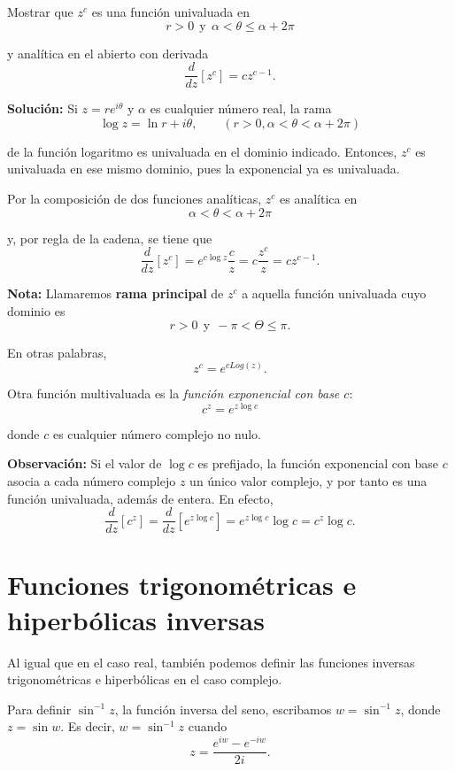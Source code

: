 \begin{ejemplo}
Mostrar que $z^c$ es una función univaluada en 
$$r > 0 ~~\mbox{y}~~ \alpha < \theta \leq \alpha + 2\pi$$

y analítica en el abierto con derivada
$$\frac{d}{dz}[z^c] = c z^{c-1}.$$

\textbf{Solución:} Si $z = r e^{i\theta}$ y $\alpha$ es cualquier número real, la rama
$$\log z = \ln r + i\theta, \qquad (r > 0, \alpha < \theta < \alpha + 2\pi)$$ 

de la función logaritmo es univaluada en el dominio indicado. Entonces, $z^c$ es univaluada en ese mismo dominio, pues la exponencial ya es univaluada.

Por la composición de dos funciones analíticas, $z^c$ es analítica en 
$$\alpha < \theta < \alpha + 2\pi$$

y, por regla de la cadena, se tiene que
$$\frac{d}{dz}[z^c] =e^{c \log z} \frac{c}{z} = c \frac{z^c}{z} = c z^{c-1}. $$

\end{ejemplo}

\textbf{Nota:} Llamaremos \textbf{rama principal} de $z^c$ a aquella función univaluada cuyo dominio es 
$$r > 0 ~~\mbox{y}~~ -\pi < \Theta \leq \pi.$$

En otras palabras,
$$z^c = e^{c Log(z)}.$$

Otra función multivaluada es la \textit{función exponencial con base $c$}:
$$c^z = e^{z \log c}$$

donde $c$ es cualquier número complejo no nulo.


\textbf{Observación:} Si el valor de $\log c$ es prefijado, la función exponencial con base $c$ asocia a cada número complejo $z$ un único valor complejo, y por tanto es una función univaluada, además de entera. En efecto,
$$\frac{d}{dz}[ c^z] = \frac{d}{dz} [e^{z \log c}] = e^{z \log c} \log c = c^z \log c. $$

\section{Funciones trigonométricas e hiperbólicas inversas}

Al igual que en el caso real, también podemos definir las funciones inversas trigonométricas e hiperbólicas en el caso complejo.

Para definir $\sin^{-1} z$, la función inversa del seno, escribamos $w = \sin^{-1} z$, donde $z = \sin w$. Es decir, $w = \sin^{-1} z$ cuando
$$z = \frac{e^{i w} - e^{-iw}}{2i}.$$

